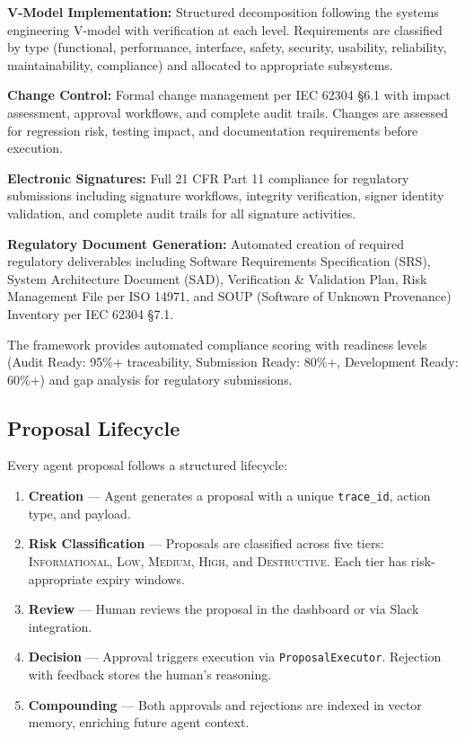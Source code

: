 \documentclass[11pt,a4paper]{article}
\begin{document}
\textbf{V-Model Implementation:} Structured decomposition following the systems engineering V-model with verification at each level. Requirements are classified by type (functional, performance, interface, safety, security, usability, reliability, maintainability, compliance) and allocated to appropriate subsystems.

\textbf{Change Control:} Formal change management per IEC 62304 §6.1 with impact assessment, approval workflows, and complete audit trails. Changes are assessed for regression risk, testing impact, and documentation requirements before execution.

\textbf{Electronic Signatures:} Full 21 CFR Part 11 compliance for regulatory submissions including signature workflows, integrity verification, signer identity validation, and complete audit trails for all signature activities.

\textbf{Regulatory Document Generation:} Automated creation of required regulatory deliverables including Software Requirements Specification (SRS), System Architecture Document (SAD), Verification \& Validation Plan, Risk Management File per ISO 14971, and SOUP (Software of Unknown Provenance) Inventory per IEC 62304 §7.1.

The framework provides automated compliance scoring with readiness levels (Audit Ready: 95\%+ traceability, Submission Ready: 80\%+, Development Ready: 60\%+) and gap analysis for regulatory submissions.

\subsection{Proposal Lifecycle}

Every agent proposal follows a structured lifecycle:

\begin{enumerate}[noitemsep]
    \item \textbf{Creation} --- Agent generates a proposal with a unique \texttt{trace\_id}, action type, and payload.
    \item \textbf{Risk Classification} --- Proposals are classified across five tiers: \textsc{Informational}, \textsc{Low}, \textsc{Medium}, \textsc{High}, and \textsc{Destructive}. Each tier has risk-appropriate expiry windows.
    \item \textbf{Review} --- Human reviews the proposal in the dashboard or via Slack integration.
    \item \textbf{Decision} --- Approval triggers execution via \texttt{ProposalExecutor}. Rejection with feedback stores the human's reasoning.
    \item \textbf{Compounding} --- Both approvals and rejections are indexed in vector memory, enriching future agent context.
\end{enumerate}
\end{document}
